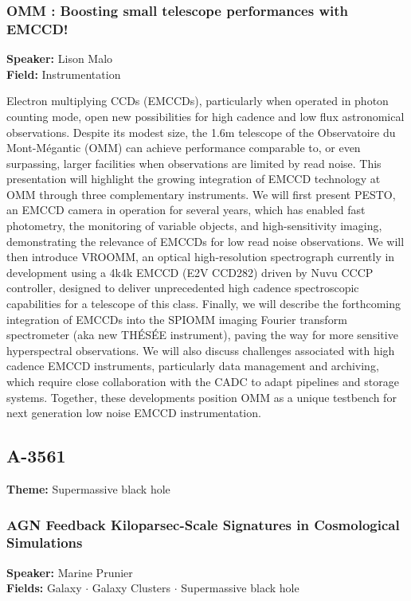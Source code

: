 \hypertarget{abstract-talk-172}{}\label{abstract-page-talk-172}
\subsubsection*{OMM : Boosting small telescope performances with EMCCD!}
\textbf{Speaker:} Lison Malo\\
\textbf{Field:} Instrumentation

Electron multiplying CCDs (EMCCDs), particularly when operated in photon counting mode, open new possibilities for high cadence and low flux astronomical observations. Despite its modest size, the 1.6m telescope of the Observatoire du Mont-Mégantic (OMM) can achieve performance comparable to, or even surpassing, larger facilities when observations are limited by read noise. This presentation will highlight the growing integration of EMCCD technology at OMM through three complementary instruments. We will first present PESTO, an EMCCD camera in operation for several years, which has enabled fast photometry, the monitoring of variable objects, and high-sensitivity imaging, demonstrating the relevance of EMCCDs for low read noise observations. We will then introduce VROOMM, an optical high-resolution spectrograph currently in development using a 4k4k EMCCD (E2V CCD282) driven by Nuvu CCCP controller, designed to deliver unprecedented high cadence spectroscopic capabilities for a telescope of this class. Finally, we will describe the forthcoming integration of EMCCDs into the SPIOMM imaging Fourier transform spectrometer (aka new THÉSÉE instrument), paving the way for more sensitive hyperspectral observations. We will also discuss challenges associated with high cadence EMCCD instruments, particularly data management and archiving, which require close collaboration with the CADC to adapt pipelines and storage systems. Together, these developments position OMM as a unique testbench for next generation low noise EMCCD instrumentation.

\subsection*{A-3561}
\textbf{Theme:} Supermassive black hole

\hypertarget{abstract-talk-18}{}\label{abstract-page-talk-18}
\subsubsection*{AGN Feedback Kiloparsec-Scale Signatures in Cosmological Simulations}
\textbf{Speaker:} Marine Prunier\\
\textbf{Fields:} Galaxy $\cdot$ Galaxy Clusters $\cdot$ Supermassive black hole

